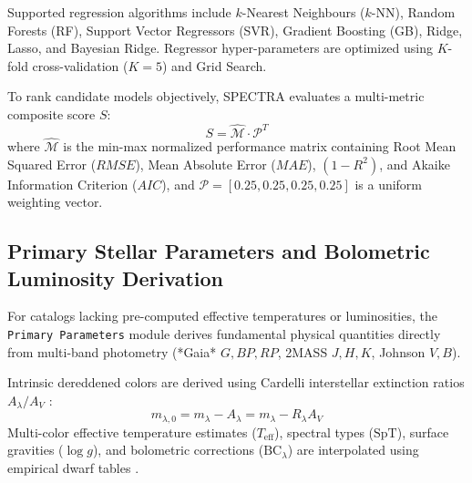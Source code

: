 \documentclass[fleqn,usenatbib]{mnras}
\begin{document}
Supported regression algorithms include $k$-Nearest Neighbours ($k$-NN), Random Forests (RF), Support Vector Regressors (SVR), Gradient Boosting (GB), Ridge, Lasso, and Bayesian Ridge. Regressor hyper-parameters are optimized using $K$-fold cross-validation ($K=5$) and Grid Search.

To rank candidate models objectively, \textsc{SPECTRA} evaluates a multi-metric composite score $S$:
\begin{equation}
    S = \hat{\mathcal{M}} \cdot \mathcal{P}^T
    \label{eq:composite_score}
\end{equation}
where $\hat{\mathcal{M}}$ is the min-max normalized performance matrix containing Root Mean Squared Error ($RMSE$), Mean Absolute Error ($MAE$), $(1 - R^2)$, and Akaike Information Criterion ($AIC$), and $\mathcal{P} = [0.25, 0.25, 0.25, 0.25]$ is a uniform weighting vector.


\subsection{Primary Stellar Parameters and Bolometric Luminosity Derivation}
\label{sec:primary_params}

For catalogs lacking pre-computed effective temperatures or luminosities, the \texttt{Primary Parameters} module derives fundamental physical quantities directly from multi-band photometry (*Gaia* $G, BP, RP$, 2MASS $J, H, K$, Johnson $V, B$).

Intrinsic dereddened colors are derived using Cardelli interstellar extinction ratios $A_\lambda / A_V$ \citep{cardelli1989relationship}:
\begin{equation}
    m_{\lambda,0} = m_\lambda - A_\lambda = m_\lambda - R_\lambda A_V
    \label{eq:dereddening}
\end{equation}
Multi-color effective temperature estimates ($T_{\text{eff}}$), spectral types ($\text{SpT}$), surface gravities ($\log g$), and bolometric corrections ($\text{BC}_\lambda$) are interpolated using empirical dwarf tables \citep{pecaut2013intrinsic}.
\end{document}
